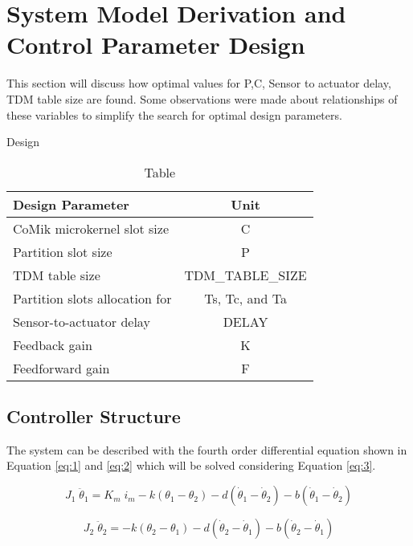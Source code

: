 \section{System Model Derivation and Control Parameter Design}

This section will discuss how optimal values for P,C, Sensor to actuator delay, TDM table size are found. Some observations were made about relationships of these variables to simplify the search for optimal design parameters.

Design
\begin{table}[h!]
	\centering
	\caption{Table}
	\begin{tabular}{lc}
		\toprule
		Design Parameter & Unit\\
		\midrule
		CoMik microkernel slot size&C\\
		Partition slot size& P\\
		TDM table size& TDM\_TABLE\_SIZE\\
		Partition slots allocation	for	&Ts,	Tc,	and	Ta\\
		Sensor-to-actuator	delay& DELAY	\\
		Feedback gain& K\\
		Feedforward gain& F\\
		\midrule		
	\end{tabular}
	\label{tab:design}
\end{table}
 

\subsection{Controller Structure}

The system can be described with the fourth order differential equation shown in Equation \ref{eq:1} and \ref{eq:2} which will be solved considering Equation \ref{eq:3}. 


\begin{equation}
J_1 \; \ddot{\theta}_1 = K_m \; i_m - k(\theta_1-\theta_2) - d(\dot{\theta}_1-\dot{\theta}_2) - b(\dot{\theta}_1-\dot{\theta}_2)
\label{eq:1}
\end{equation}

\begin{equation}
J_2 \; \ddot{\theta}_2 = -k(\theta_2-\theta_1) - d(\dot{\theta}_2-\dot{\theta}_1) - b(\dot{\theta}_2-\dot{\theta}_1)
\label{eq:2}
\end{equation}

